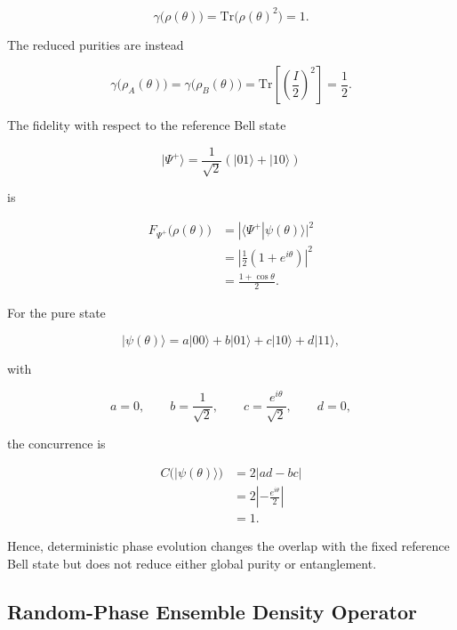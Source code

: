 \begin{equation}
\gamma\big(\rho(\theta)\big)
=
\mathrm{Tr}\big(\rho(\theta)^2\big)
=
1.
\label{eq:d5_phase_shifted_global_purity}
\end{equation}

The reduced purities are instead

\begin{equation}
\gamma\big(\rho_A(\theta)\big)
=
\gamma\big(\rho_B(\theta)\big)
=
\mathrm{Tr}\left[\left(\frac{I}{2}\right)^2\right]
=
\frac{1}{2}.
\label{eq:d5_phase_shifted_reduced_purity}
\end{equation}

The fidelity with respect to the reference Bell state

\[
|\Psi^+\rangle
=
\frac{1}{\sqrt{2}}
\left(
|01\rangle + |10\rangle
\right)
\]

is

\begin{align}
F_{\Psi^+}\big(\rho(\theta)\big)
&=
|\langle\Psi^+|\psi(\theta)\rangle|^2
\nonumber
\\
&=
\left|
\frac{1}{2}
\left(
1+e^{i\theta}
\right)
\right|^2
\nonumber
\\
&=
\frac{1+\cos\theta}{2}.
\label{eq:d5_phase_shifted_fidelity}
\end{align}

For the pure state

\[
|\psi(\theta)\rangle
=
a|00\rangle+b|01\rangle+c|10\rangle+d|11\rangle,
\]

with

\[
a=0,
\qquad
b=\frac{1}{\sqrt{2}},
\qquad
c=\frac{e^{i\theta}}{\sqrt{2}},
\qquad
d=0,
\]

the concurrence is

\begin{align}
C\big(|\psi(\theta)\rangle\big)
&=
2|ad-bc|
\nonumber
\\
&=
2\left|-
\frac{e^{i\theta}}{2}
\right|
\nonumber
\\
&=
1.
\label{eq:d5_phase_shifted_concurrence}
\end{align}

Hence, deterministic phase evolution changes the overlap with the fixed reference Bell state but does not reduce either global purity or entanglement.


\subsection{Random-Phase Ensemble Density Operator}

